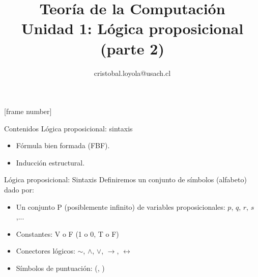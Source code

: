 \documentclass{beamer}
\begin{document}
\title[Lógica proposicional]{Teoría de la Computación \\ Unidad 1: Lógica
  proposicional (parte 2)} \author[Teoría de la
Computación]{cristobal.loyola@usach.cl} \date{}


\frame{\titlepage}

[frame number]

\begin{frame}{Contenidos}
  Lógica proposicional: sintaxis
  \begin{itemize}
    \item Fórmula bien formada (FBF).
    \item Inducción estructural.
  \end{itemize}
\end{frame}


\begin{frame}{Lógica proposicional: Sintaxis}
  Definiremos un conjunto de símbolos (alfabeto) dado por:
  \begin{itemize}[<+->]
    \item Un conjunto P (posiblemente infinito) de variables proposicionales: $p$, $q$, $r$, $s$,...
    \item Constantes: V o F (1 o 0, T o F)
    \item Conectores lógicos: $\sim$, $\land$, $\vee$, $\rightarrow$,
          $\leftrightarrow$
    \item Símbolos de puntuación: (, )
  \end{itemize}
\end{frame}
\end{document}
